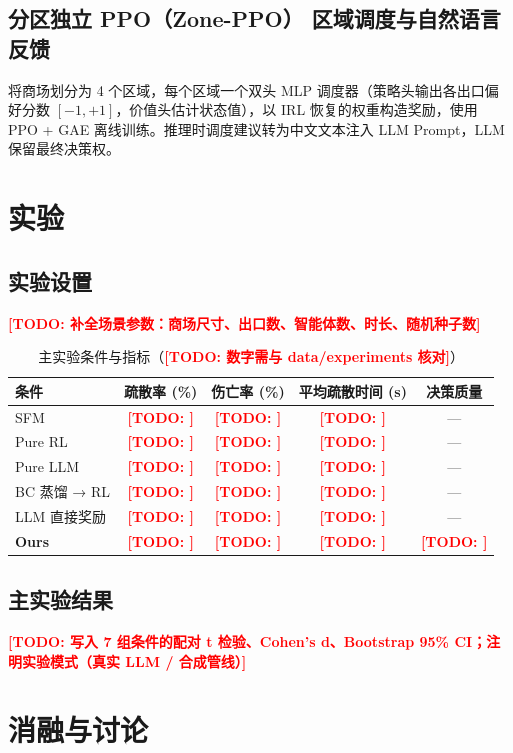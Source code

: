\documentclass[UTF8,zihao=-4]{ctexart}
\newcommand{\todo}[1]{\textcolor{red}{\textbf{[TODO: #1]}}}
\begin{document}
\subsection{分区独立 PPO（Zone-PPO） 区域调度与自然语言反馈}

将商场划分为 4 个区域，每个区域一个双头 MLP 调度器（策略头输出各出口偏好分数 $[-1,+1]$，价值头估计状态值），以 IRL 恢复的权重构造奖励，使用 PPO + GAE 离线训练。推理时调度建议转为中文文本注入 LLM Prompt，LLM 保留最终决策权。

\section{实验}

\subsection{实验设置}

\todo{补全场景参数：商场尺寸、出口数、智能体数、时长、随机种子数}

\begin{table}[t]
  \centering
  \caption{主实验条件与指标（\todo{数字需与 data/experiments 核对}）}
  \label{tab:conditions}
  \begin{tabular}{lcccc}
    \toprule
    条件 & 疏散率 (\%) & 伤亡率 (\%) & 平均疏散时间 (s) & 决策质量 \\
    \midrule
    SFM           & \todo{} & \todo{} & \todo{} & --- \\
    Pure RL       & \todo{} & \todo{} & \todo{} & --- \\
    Pure LLM      & \todo{} & \todo{} & \todo{} & --- \\
    BC 蒸馏 → RL  & \todo{} & \todo{} & \todo{} & --- \\
    LLM 直接奖励  & \todo{} & \todo{} & \todo{} & --- \\
    \textbf{Ours} & \todo{} & \todo{} & \todo{} & \todo{} \\
    \bottomrule
  \end{tabular}
\end{table}

\subsection{主实验结果}

\todo{写入 7 组条件的配对 t 检验、Cohen's d、Bootstrap 95\% CI；注明实验模式（真实 LLM / 合成管线）}

\section{消融与讨论}
\end{document}
